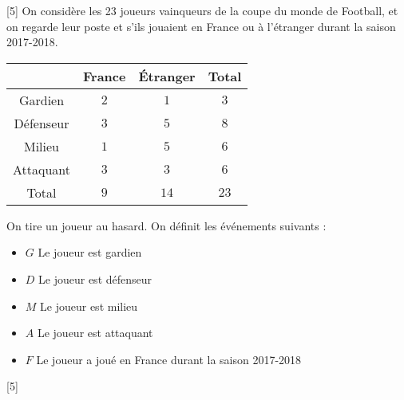 \documentclass{exam}
\begin{document}
\begin{questions}
[5]
On considère les 23 joueurs vainqueurs de la coupe du monde de Football, et on regarde leur poste et s'ils jouaient en France ou à l'étranger durant la saison 2017-2018.
\begin{center}
\begin{tabular}{|c|c|c|c|}
\hline
&France&Étranger&Total\\
\hline
Gardien&$2$&$1$&$3$\\
\hline
Défenseur&$3$&$5$&$8$\\
\hline
Milieu&$1$&$5$&$6$\\
\hline
Attaquant&$3$&$3$&$6$\\
\hline
Total&$9$&$14$&$23$\\
\hline
\end{tabular}
\end{center}
On tire un joueur au hasard. On définit les événements suivants :
\begin{itemize}
\item $G$ \og Le joueur est gardien \fg
\item $D$ \og Le joueur est défenseur \fg
\item $M$ \og Le joueur est milieu \fg
\item $A$ \og Le joueur est attaquant \fg
\item $F$ \og Le joueur a joué en France durant la saison 2017-2018 \fg 
\end{itemize}
\vspace*{1cm}
[5]
\begin{parts}

\end{parts}
\end{questions}
\end{document}
